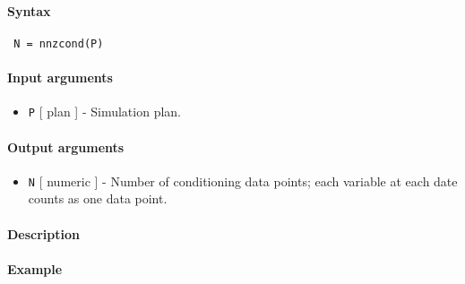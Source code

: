 


	\paragraph{Syntax}
 
 \begin{verbatim}
 N = nnzcond(P)
 \end{verbatim}
 
 \paragraph{Input arguments}
 
 \begin{itemize}
 \item
   \texttt{P} {[} plan {]} - Simulation plan.
 \end{itemize}
 
 \paragraph{Output arguments}
 
 \begin{itemize}
 \item
   \texttt{N} {[} numeric {]} - Number of conditioning data points; each
   variable at each date counts as one data point.
 \end{itemize}
 
 \paragraph{Description}
 
 \paragraph{Example}


